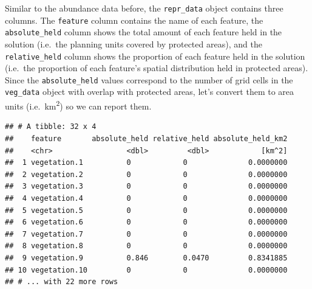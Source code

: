 \documentclass[12pt,]{book}
\newenvironment{Shaded}{\begin{snugshade}}{\end{snugshade}}
\newcommand{\KeywordTok}[1]{\textcolor[rgb]{0.13,0.29,0.53}{\textbf{#1}}}
\newcommand{\DecValTok}[1]{\textcolor[rgb]{0.00,0.00,0.81}{#1}}
\newcommand{\StringTok}[1]{\textcolor[rgb]{0.31,0.60,0.02}{#1}}
\newcommand{\CommentTok}[1]{\textcolor[rgb]{0.56,0.35,0.01}{\textit{#1}}}
\newcommand{\OperatorTok}[1]{\textcolor[rgb]{0.81,0.36,0.00}{\textbf{#1}}}
\newcommand{\NormalTok}[1]{#1}
\begin{document}
Similar to the abundance data before, the \texttt{repr\_data} object
contains three columns. The \texttt{feature} column contains the name of
each feature, the \texttt{absolute\_held} column shows the total amount
of each feature held in the solution (i.e.~the planning units covered by
protected areas), and the \texttt{relative\_held} column shows the
proportion of each feature held in the solution (i.e.~the proportion of
each feature's spatial distribution held in protected areas). Since the
\texttt{absolute\_held} values correspond to the number of grid cells in
the \texttt{veg\_data} object with overlap with protected areas, let's
convert them to area units (i.e.~km\textsuperscript{2}) so we can report
them.

\begin{Shaded}
\end{Shaded}

\begin{verbatim}
## # A tibble: 32 x 4
##    feature       absolute_held relative_held absolute_held_km2
##    <chr>                 <dbl>         <dbl>            [km^2]
##  1 vegetation.1          0            0              0.0000000
##  2 vegetation.2          0            0              0.0000000
##  3 vegetation.3          0            0              0.0000000
##  4 vegetation.4          0            0              0.0000000
##  5 vegetation.5          0            0              0.0000000
##  6 vegetation.6          0            0              0.0000000
##  7 vegetation.7          0            0              0.0000000
##  8 vegetation.8          0            0              0.0000000
##  9 vegetation.9          0.846        0.0470         0.8341885
## 10 vegetation.10         0            0              0.0000000
## # ... with 22 more rows
\end{verbatim}
\end{document}
